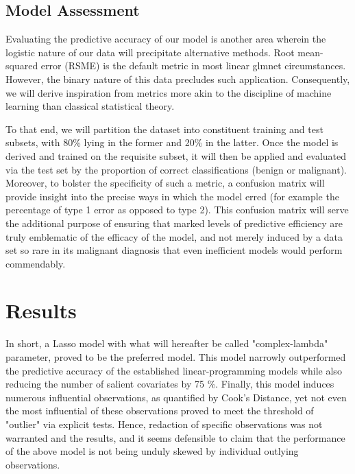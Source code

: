 \documentclass[11pt]{article}
\begin{document}
\subsection{Model Assessment}

	Evaluating the predictive accuracy of our model is another area wherein the logistic nature of our data will precipitate alternative methods.  Root mean-squared error (RSME) is the default metric in most linear glmnet circumstances.  However, the binary nature of this data precludes such application.  Consequently, we will derive inspiration from metrics more akin to the discipline of machine learning than classical statistical theory.  
	
	To that end, we will partition the dataset into constituent training and test subsets, with 80\% lying in the former and 20\% in the latter.  Once the model is derived and trained on the requisite subset, it will then be applied and evaluated via the test set by the proportion of correct classifications (benign or malignant).  Moreover, to bolster the specificity of such a metric, a confusion matrix will provide insight into the precise ways in which the model erred (for example the percentage of type 1 error as opposed to type 2).  This confusion matrix will serve the additional purpose of ensuring that marked levels of predictive efficiency are truly emblematic of the efficacy of the model, and not merely induced by a data set so rare in its malignant diagnosis that even inefficient models would perform commendably.  
	
	\section{Results}

	In short, a Lasso model with what will hereafter be called "complex-lambda" parameter, proved to be the preferred model.  This model narrowly outperformed the predictive accuracy of the established linear-programming models while also reducing the number of salient covariates by 75 \%.  Finally, this model induces numerous influential observations, as quantified by Cook's Distance, yet not even the most influential of these observations proved to meet the threshold of "outlier" via explicit tests.  Hence, redaction of specific observations was not warranted and the results, and it seems defensible to claim that the performance of the above model is not being unduly skewed by individual outlying observations.  
	
\end{document}
